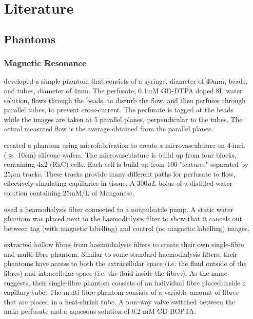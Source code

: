 \chapter{Literature}
\label{ch:literature}

\section{Phantoms}
\subsection{Magnetic Resonance}
\cite{noguchi2007quantitative} developed a simple phantom that consists of a syringe, diameter of 40mm, beads, and tubes, diameter of 4mm. The perfusate, 0.1mM GD-DTPA doped 8L water solution, flows through the beads, to disturb the flow, and then perfuses through parallel tubes, to prevent cross-current. The perfusate is tagged at the beads while the images are taken at 5 parallel planes, perpendicular to the tubes. The actual measured flow is the average obtained from the parallel planes. 

\cite{ebrahimi2010microfabricated} created a phantom using microfabrication to create a microvasculature on 4-inch ($\approx$ 10cm) silicone wafers. The microvasculature is build up from four blocks, containing 4x2 (RxC) cells. Each cell is build up from 100 "features" separated by 25$\mu$m tracks. These tracks provide many different paths for perfusate to flow, effectively simulating capillaries in tissue. A $300\mu L$ bolus of a distilled water solution containing 25mM/L of Manganese.

\cite{wang2010flow} used a heamodialysis filter connected to a nonpulsatile pump. A static water phantom was placed next to the haemodialysis filter to show that it cancels out between tag (with magnetic labelling) and control (no magnetic labelling) images.

\cite{anderson2011semipermeable} extracted hollow fibres from haemodialysis filters to create their own single-fibre and multi-fibre phantom. Similar to some standard haemodialysis filters, their phantoms have access to both the extracellular space (i.e. the fluid outside of the fibres) and intracellular space (i.e. the fluid inside the fibres). As the name suggests, their single-fibre phantom consists of an individual fibre placed inside a capillary tube. The multi-fibre phantom consists of a variable amount of fibres that are placed in a heat-shrink tube. A four-way valve switched between the main perfusate and a aquesous solution of 0.2 mM GD-BOPTA.

